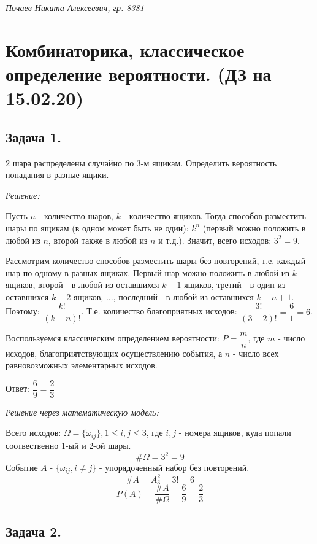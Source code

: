 

	
\textit{Почаев Никита Алексеевич, гр. 8381}

\section{Комбинаторика, классическое определение вероятности. (ДЗ на 15.02.20)}

\subsection{Задача 1.}

2 шара распределены случайно по 3-м ящикам. Определить вероятность попадания в разные ящики.

\textit{Решение:}

Пусть $n$ - количество шаров, $k$ - количество ящиков. Тогда способов разместить шары по ящикам (в одном может быть не один): $k^n$ (первый можно положить в любой из $n$, второй также в любой из $n$ и т.д.). Значит, всего исходов: $3^2=9$.

Рассмотрим количество способов разместить шары без повторений, т.е. каждый шар по одному в разных ящиках. Первый шар можно положить в любой из $k$ ящиков, второй - в любой из оставшихся $k-1$ ящиков, третий - в один из оставшихся $k-2$ ящиков, $\dots$, последний - в любой из оставшихся $k-n+1$. Поэтому: $\dfrac{k!}{(k-n)!}$. Т.е. количество благоприятных исходов: $\dfrac{3!}{(3-2)!} = \dfrac{6}{1} = 6$.

Воспользуемся классическим определением вероятности: $P = \dfrac{m}{n}$, где $m$ - число исходов, благоприятствующих осуществлению события, а $n$ - число всех равновозможных элементарных исходов.

\noindent Ответ: $\dfrac{6}{9} = \dfrac{2}{3}$

\textit{Решение через математическую модель:}

\noindent Всего исходов: $\Omega = \{ \omega_{ij} \}, 1 \le i, j \le 3$, где $i, j$ - номера ящиков, куда попали соотвественно 1-ый и 2-ой шары.
\[ \# \Omega = 3^2 = 9 \]
\noindent Событие $A$ - $\{ \omega_{ij}, i \ne j \}$ - упорядоченный набор без повторений.
\[ \#A = A_3^2 = 3! = 6 \]
\[ P(A) = \dfrac{\# A}{\# \Omega} = \dfrac{6}{9} = \dfrac{2}{3} \]

\subsection{Задача 2.}

